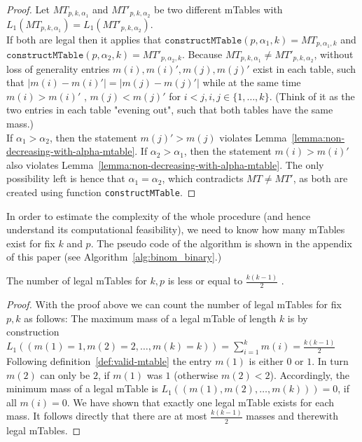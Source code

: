 \begin{proof}
\label{proof: mtable-mass-injection}
Let $MT_{p,k,\alpha_1}$ and $MT'_{p,k, \alpha_2}$ be two different mTables with $L_1(MT_{p,k,\alpha_1 }) = L_1(MT'_{p,k,\alpha_2})$.\\
%
If both are legal then it applies that $\texttt{constructMTable}(p,\alpha_1 ,k)=MT_{p,\alpha_1 ,k}$
and \\ $\texttt{constructMTable}(p,\alpha_2 ,k)=MT'_{p,\alpha_2 ,k}$.
%
Because $MT_{p,k,\alpha_1} \neq MT'_{p,k,\alpha_2}$, without loss of generality entries $m(i), m(i)' , m(j) , m(j)'$ exist in each table, such that $|m(i) - m(i)'| = |m(j) - m(j)'|$ while at the same time $m(i) > m(i)'$ , $m(j) < m(j)'$ for $i<j, i,j \in \lbrace 1, \ldots , k \rbrace$.
%
(Think of it as the two entries in each table "evening out", such that both tables have the same mass.)\\
%
If $\alpha_1 > \alpha_2$, then the statement $m(j)' > m(j)$ violates Lemma~\ref{lemma:non-decreasing-with-alpha-mtable}.
%
If $\alpha_2 > \alpha_1$, then the statement $m(i) > m(i)'$ also violates Lemma~\ref{lemma:non-decreasing-with-alpha-mtable}.
%
The only possibility left is hence that $\alpha_1 = \alpha_2$, which contradicts $MT \neq MT'$, as both are created using function \texttt{constructMTable}.
\end{proof}

In order to estimate the complexity of the whole procedure (and hence understand its computational feasibility), we need to know how many mTables exist for fix $k$ and $p$.
%
The pseudo code of the algorithm is shown in the appendix of this paper (see Algorithm~\ref{alg:binom_binary}.)
\begin{theorem}
\label{theorem:number-of-mtables}
The number of legal mTables for $k,p$ is less or equal to $\frac{k(k-1)}{2}$ .
\end{theorem}

\begin{proof}
\label{proof:number-of-mtables}
With the proof above we can count the number of legal mTables for fix $p,k$ as follows: The maximum mass of a legal mTable of length $k$ is by construction
$L_1 ((m(1) = 1,m(2) = 2, \ldots, m(k) = k)) = \sum_{i=1}^k m(i) = \frac{k(k-1)}{2}$
%
Following definition~\ref{def:valid-mtable} the entry $m(1)$ is either $0$ or $1$.
%
In turn $m(2)$ can only be $2$, if $m(1)$ was $1$ (otherwise $m(2)<2$).
%
Accordingly, the minimum mass of a legal mTable is $L_1((m(1),m(2), \ldots, m(k))) = 0$, if all $m(i)=0$.
%
We have shown that exactly one legal mTable exists for each mass.
%
It follows directly that there are at most $\frac{k(k-1)}{2}$ masses and therewith legal mTables.
\end{proof}

